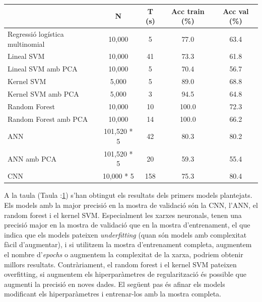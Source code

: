 \documentclass[12pt, spanish]{article}
\begin{document}
\begin{table}[hbt!]
\centering
\begin{tabular}{lcccc}  
\toprule
                                              & N         & T (s)  & Acc train (\%) & Acc val (\%) \\  
\midrule
Regressió logística multinomial  & 10,000 & 5   & 77.0        & 63.4 \\
Lineal SVM                              & 10,000 & 41  & 73.3       & 61.8  \\
Lineal SVM amb PCA                & 10,000 & 5    & 70.4       & 56.7  \\
Kernel SVM                             & 5,000   & 5    & 89.0       & 68.8  \\
Kernel SVM amb PCA               & 5,000   & 3    & 94.5       & 64.8  \\
Random Forest                        & 10,000 & 10  & 100.0     & 72.3 \\
Random Forest amb PCA          & 10,000 & 14  & 100.0     & 66.2  \\
ANN 				      & 101,520 * 5 & 42 & 80.3 & 80.2  \\
ANN amb PCA                         & 101,520 * 5 & 20 & 59.3 & 55.4 \\
CNN					     & 10,000 * 5   & 158 & 75.3 & 80.4 \\
\bottomrule
\end{tabular}
\label{tab:taula2}
\end{table}

A la taula (Taula :\ref{tab:taula2}) s'han obtingut els resultats dels primers models plantejats. Els models amb la major precisió en la mostra de validació són la CNN, l'ANN, el random forest i el kernel SVM. Especialment les xarxes neuronals, tenen una precisió major en la mostra de validació que en la mostra d'entrenament, el que indica que els models pateixen \textit{underfitting} (quan són models amb complexitat fàcil d'augmentar), i si utilitzem la mostra d'entrenament completa, augmentem el nombre d'\textit{epochs} o augmentem la complexitat de la xarxa, podriem obtenir millors resultats. Contràriament, el random forest i el kernel SVM pateixen overfitting, si augmentem els hiperparàmetres de regularització és possible que augmenti la precisió en noves dades. El següent pas és afinar els models modificant els hiperparàmetres i entrenar-los amb la mostra completa.
\end{document}
